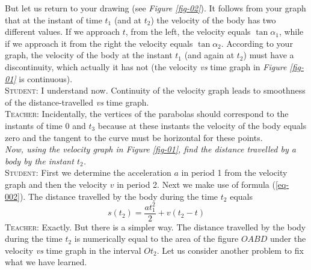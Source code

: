 \documentclass[a4paper,sfsidenotes]{tufte-book}
\begin{document}
But let us return to your drawing (see \emph{Figure \ref{fig-02}}). It follows from your graph that at the instant of time $t_{1}$ (and at $t_{2}$) the velocity of the body has two different values. If we approach $t$, from the left, the velocity equals $\tan \alpha_{1}$, while if we approach it from the right the velocity equals $\tan \alpha_{2}$. According to your graph, the velocity of the body at the instant $t_{1}$ (and again at $t_{2}$) must have a discontinuity, which actually it has not (the velocity \emph{vs} time graph in \emph{Figure \ref{fig-01}} is continuous).\\

\textsc{Student:} I understand now. Continuity of the velocity graph leads to smoothness of the distance-travelled \emph{vs} time graph.\\

\textsc{Teacher:} Incidentally, the vertices of the parabolas should correspond to the instants of time 0 and $t_{3}$ because at these instants the velocity of the body equals zero and the tangent
to the curve must be horizontal for these points. \\
\textit{Now, using the velocity graph in Figure \ref{fig-01}, find the distance travelled by a body by the instant $t_{2}$.} \\
\textsc{Student:} First we determine the acceleration $a$ in period 1 from the velocity graph and then the velocity $v$ in period 2. Next we make use of formula (\ref{eq-002}). The distance travelled by the body during the time $t_{2}$ equals
$$
s(t_{2}) = \frac{at_{1}^{2}}{2}+v(t_{2}-t)
$$
\textsc{Teacher:} Exactly. But there is a simpler way. The distance travelled by the body during the time $t_{2}$ is numerically equal to the area of the figure $OABD$ under the velocity \emph{vs} time graph in the interval $Ot_{2}$. Let us consider another problem to fix what we have learned.\\
\end{document}
